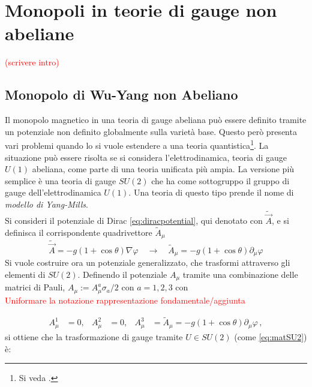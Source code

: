 \chapter{Monopoli in teorie di gauge non abeliane}
\textcolor{red}{(scrivere intro)}\\
%
\section{Monopolo di Wu-Yang non Abeliano}
Il monopolo magnetico in una teoria di gauge abeliana può essere definito tramite
un potenziale non definito globalmente sulla varietà base. Questo però presenta
vari problemi quando lo si vuole estendere a una teoria quantistica\footnote{
   Si veda \cite{nakahara}.
}.
La situazione può essere risolta se si considera l'elettrodinamica, teoria
di gauge $U(1)$ abeliana, come parte di una teoria unificata più ampia. La versione
più semplice è una teoria di gauge $SU(2)$ che ha come sottogruppo il gruppo
di gauge dell'elettrodinamica $U(1)$. Una teoria di questo tipo prende il nome
di \emph{modello di Yang-Mills}. \\


Si consideri il potenziale di Dirac \ref{eq:diracpotential}, qui denotato con
$\tilde{\vec A}$, e si definisca il corrispondente quadrivettore $\tilde{A}_\mu$
$$
   \tilde{\vec A} = -g(1 + \cos\theta) \nabla \varphi
   \quad \to \quad
   \tilde{A}_\mu = -g(1 + \cos\theta) \partial_\mu \varphi
$$
Si vuole costruire ora un potenziale generalizzato, che trasformi attraverso
gli elementi di $SU(2)$.
Definendo il potenziale $A_\mu$ tramite una combinazione delle matrici di Pauli,
$A_\mu := A_\mu^a \sigma_a/2$ con $a = 1,2,3$ con \\
\textcolor{red}{Uniformare la notazione rappresentazione fondamentale/aggiunta}

\begin{equation}\label{eq:wuyangpotential}
   \begin{aligned}
      A_\mu^1 &= 0, & A_\mu^2 &= 0, & A_\mu^3 &= \tilde{A}_\mu =
         -g(1 + \cos\theta) \partial_\mu \varphi \, ,
   \end{aligned}
\end{equation}
si ottiene che la trasformazione di gauge tramite $U \in SU(2)$ (come \ref{eq:matSU2})
è:

